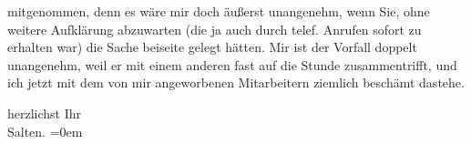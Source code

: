                   \label{K_L03333-4v}\label{K_L03333-4} mitgenommen, denn
               es wäre mir doch äußerst unangenehm, wenn Sie, ohne weitere Aufklärung abzuwarten
               (die ja auch durch telef. Anrufen sofort zu erhalten war) die Sache beiseite gelegt
               hätten. Mir ist der Vorfall doppelt unangenehm, weil er mit einem anderen fast auf
               die Stunde zusammentrifft, und ich jetzt mit dem von mir angeworbenen Mitarbeitern
               ziemlich beschämt dastehe.\pend
           
\pstart
           herzlichst Ihr {\\[\baselineskip]}\spacefill\mbox{Salten.}\pend
           \leftskip=0em{}\endnumbering{}  \newcommand{\dateiname}{L03333}\newcommand{\titel}{Felix Salten an Arthur Schnitzler, 2. 9. 1902}\newcommand{\editorInnen}{Martin Anton Müller und Laura Untner}
